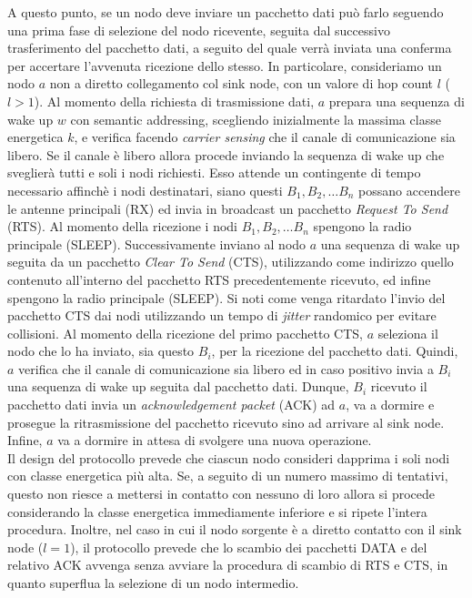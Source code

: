 \documentclass{report}
\begin{document}
A questo punto, se un nodo deve inviare un pacchetto dati può farlo seguendo una prima fase di selezione del nodo ricevente, seguita dal
successivo trasferimento del pacchetto dati, a seguito del quale verrà inviata una conferma per accertare l'avvenuta ricezione dello stesso. In particolare,
consideriamo un nodo $a$ non a diretto collegamento col sink node, con un valore di hop count $l$ ($l>1$). Al momento della richiesta di trasmissione dati,
$a$ prepara una sequenza di wake up $w$ con semantic addressing, scegliendo inizialmente la massima classe energetica $k$, e verifica facendo
\emph{carrier sensing} che il canale di comunicazione sia libero. Se il canale è libero allora procede inviando la sequenza di wake up che sveglierà tutti
e soli i nodi richiesti. Esso attende un contingente di tempo necessario affinchè i nodi destinatari, siano questi $B_1, B_2, \ldots B_n$ 
possano accendere le antenne principali (RX) ed invia in broadcast un pacchetto \emph{Request To Send} (RTS). Al momento della ricezione 
i nodi $B_1, B_2, \ldots B_n$ spengono la radio principale (SLEEP). Successivamente inviano al nodo $a$ una sequenza di wake up seguita da un pacchetto
\emph{Clear To Send} (CTS), utilizzando come indirizzo quello contenuto all'interno del pacchetto RTS precedentemente ricevuto, ed infine spengono
la radio principale (SLEEP). Si noti come venga ritardato l'invio del pacchetto CTS dai nodi utilizzando un tempo di \emph{jitter} randomico
per evitare collisioni. Al momento della ricezione del primo pacchetto CTS, $a$ seleziona il nodo che lo ha inviato, sia questo $B_i$,
per la ricezione del pacchetto dati. Quindi, $a$ verifica che il canale di comunicazione sia libero ed in caso positivo invia a $B_i$ una sequenza di wake up
seguita dal pacchetto dati. Dunque, $B_i$ ricevuto il pacchetto dati invia un \emph{acknowledgement packet} (ACK) ad $a$, va a dormire e prosegue la
ritrasmissione del pacchetto ricevuto sino ad arrivare al sink node. Infine, $a$ va a dormire in attesa di svolgere una nuova operazione.\\

Il design del protocollo prevede che ciascun nodo consideri dapprima i soli nodi con classe energetica più alta. Se, a seguito di un numero massimo di tentativi,
questo non riesce a mettersi in contatto con nessuno di loro allora si procede considerando la classe energetica immediamente inferiore e si ripete
l'intera procedura. Inoltre, nel caso in cui il nodo sorgente è a diretto contatto con il sink node ($l=1$), il protocollo prevede che
lo scambio dei pacchetti DATA e del relativo ACK avvenga senza avviare la procedura di scambio di RTS e CTS, in quanto superflua la
selezione di un nodo intermedio.\\
\end{document}

